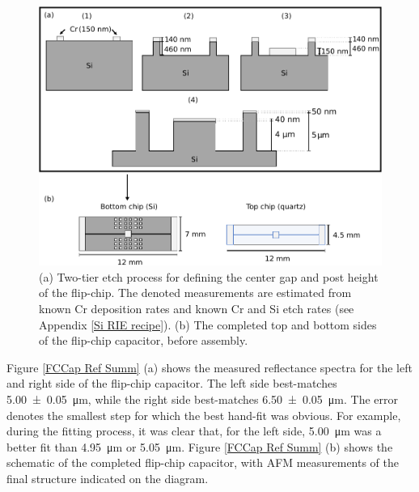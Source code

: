 \documentclass[double,12pt,1in]{beavtex}
\begin{document}
\begin{figure}
    \includegraphics[width=1\textwidth]{Two-tier etch.pdf}
    \caption{(a) Two-tier etch process for defining the center gap and post height of the flip-chip. The denoted measurements are estimated from known Cr deposition rates and known Cr and Si etch rates (see Appendix \ref{Si RIE recipe}). (b) The completed top and bottom sides of the flip-chip capacitor, before assembly.}
    \label{twotier}
\end{figure}

Figure \ref{FCCap Ref Summ} (a) shows the measured reflectance spectra for the left and right side of the flip-chip capacitor. The left side best-matches \SI{5.00(5)}{\micro\meter}, while the right side best-matches \SI{6.50(5)}{\micro\meter}. The error denotes the smallest step for which the best hand-fit was obvious. For example, during the fitting process, it was clear that, for the left side, \SI{5.00}{\micro\meter} was a better fit than \SI{4.95}{\micro\meter} or \SI{5.05}{\micro\meter}. Figure \ref{FCCap Ref Summ} (b) shows the schematic of the completed flip-chip capacitor, with AFM measurements of the final structure indicated on the diagram.
\end{document}
